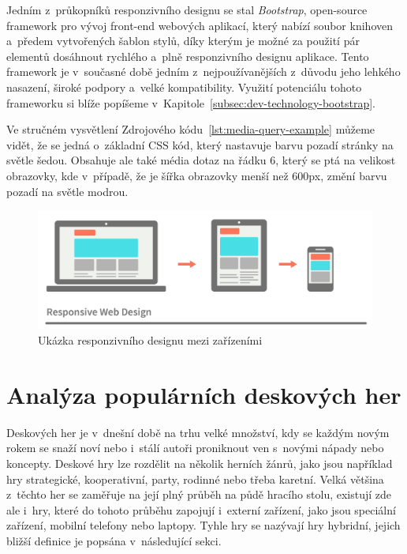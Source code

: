 Jedním z~průkopníků responzivního designu se stal \textit{Bootstrap}, open-source framework pro vývoj front-end webových aplikací, který nabízí soubor knihoven a~předem vytvořených šablon stylů, díky kterým je možné za použití pár elementů dosáhnout rychlého a~plně responzivního designu aplikace. Tento framework je v~současné době jedním z~nejpoužívanějších z~důvodu jeho lehkého nasazení, široké podpory a~velké kompatibility. Využití potenciálu tohoto frameworku si blíže popíšeme v~Kapitole~\ref{subsec:dev-technology-bootstrap}.



Ve stručném vysvětlení Zdrojového kódu~\ref{lst:media-query-example} můžeme vidět, že se jedná o~základní CSS kód, který nastavuje barvu pozadí stránky na světle šedou. Obsahuje ale také média dotaz na řádku 6, který se ptá na velikost obrazovky, kde v~případě, že je šířka obrazovky menší než 600px, změní barvu pozadí na světle modrou.

\begin{figure}[H]
    \centering
    \includegraphics[width=1.0\textwidth]{figures/responsiveDesign}
    \caption{Ukázka responzivního designu mezi zařízeními \cite{responsive_design}}
    \label{fig:responsive-design-example}
\end{figure}

\section{Analýza populárních deskových her}
\label{sec:popular-board-games-analysis}
Deskových her je v~dnešní době na trhu velké množství, kdy se každým novým rokem se snaží noví nebo i~stálí autoři proniknout ven s~novými nápady nebo koncepty. Deskové hry lze rozdělit na několik herních žánrů, jako jsou například hry strategické, kooperativní, party, rodinné nebo třeba karetní. Velká většina z~těchto her se zaměřuje na její plný průběh na půdě hracího stolu, existují zde ale i~hry, které do tohoto průběhu zapojují i~externí zařízení, jako jsou speciální zařízení, mobilní telefony nebo laptopy. Tyhle hry se nazývají hry hybridní, jejich bližší definice je popsána v~následující sekci.

